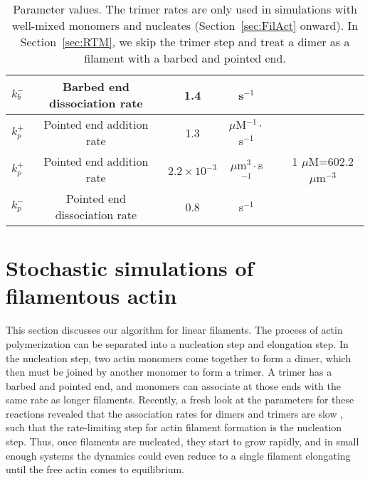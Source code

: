 \documentclass[11pt]{article}
\begin{document}
\begin{table}
\begin{center}
\begin{tabular}{|c|c|c|c|c|c|}
$k_b^-$ & Barbed end dissociation rate & 1.4 & s$^{-1}$ & \cite{rosenbloom2021mechanism} &\\ \hline
$k_p^+$ & Pointed end addition rate& 1.3& $\mu$M$^{-1}\cdot$s$^{-1}$ & \cite{rosenbloom2021mechanism} & \\ 
$k_p^+$ &  Pointed end addition rate& $2.2 \times 10^{-3}$ & $\mu$m$^{3} \cdot$s$^{-1}$ & & 1 $\mu$M=602.2 $\mu$m$^{-3}$ \\
$k_p^-$ & Pointed end dissociation rate & 0.8 & s$^{-1}$ & \cite{rosenbloom2021mechanism} &\\ \hline
\end{tabular}
\caption{\label{tab:params} Parameter values. The trimer rates are only used in simulations with well-mixed monomers and nucleates (Section\ \ref{sec:FilAct} onward). In Section\ \ref{sec:RTM}, we skip the trimer step and treat a dimer as a filament with a barbed and pointed end.}
\end{center}
\end{table}



\section{Stochastic simulations of filamentous actin \label{sec:FilAct}}
This section discusses our algorithm for linear filaments. The process of actin polymerization can be separated into a nucleation step and elongation step. In the nucleation step, two actin monomers come together to form a dimer, which then must be joined by another monomer to form a trimer. A trimer has a barbed and pointed end, and monomers can associate at those ends with the same rate as longer filaments. Recently, a fresh look at the parameters for these reactions revealed that the association rates for dimers and trimers are slow \cite{rosenbloom2021mechanism}, such that the rate-limiting step for actin filament formation is the nucleation step. Thus, once filaments are nucleated, they start to grow rapidly, and in small enough systems the dynamics could even reduce to a single filament elongating until the free actin comes to equilibrium. 
\end{document}
